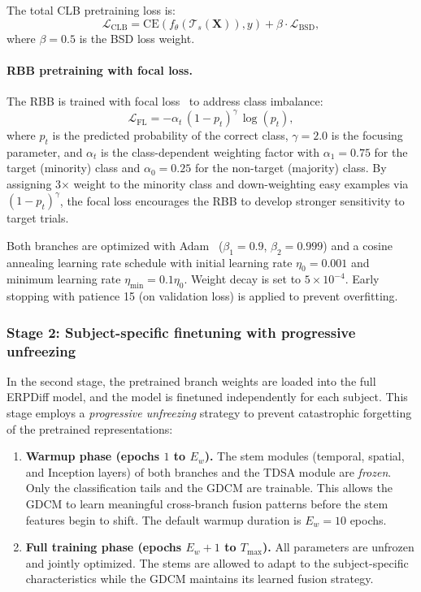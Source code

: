 The total CLB pretraining loss is:
\begin{equation}
    \mathcal{L}_{\text{CLB}} = \text{CE}(f_\theta(\mathcal{T}_s(\mathbf{X})), y) + \beta \cdot \mathcal{L}_{\text{BSD}},
\end{equation}
where $\beta = 0.5$ is the BSD loss weight.

\paragraph{RBB pretraining with focal loss.}
The RBB is trained with focal loss~\cite{lin2017focal} to address class imbalance:
\begin{equation}\label{eq:focal}
    \mathcal{L}_{\text{FL}} = -\alpha_t \, (1 - p_t)^\gamma \, \log(p_t),
\end{equation}
where $p_t$ is the predicted probability of the correct class, $\gamma = 2.0$ is the focusing parameter, and $\alpha_t$ is the class-dependent weighting factor with $\alpha_1 = 0.75$ for the target (minority) class and $\alpha_0 = 0.25$ for the non-target (majority) class. By assigning 3$\times$ weight to the minority class and down-weighting easy examples via $(1 - p_t)^\gamma$, the focal loss encourages the RBB to develop stronger sensitivity to target trials.

Both branches are optimized with Adam~\cite{kingma2015adam} ($\beta_1 = 0.9$, $\beta_2 = 0.999$) and a cosine annealing learning rate schedule with initial learning rate $\eta_0 = 0.001$ and minimum learning rate $\eta_{\min} = 0.1 \eta_0$. Weight decay is set to $5 \times 10^{-4}$. Early stopping with patience 15 (on validation loss) is applied to prevent overfitting.


\subsubsection{Stage 2: Subject-specific finetuning with progressive unfreezing}\label{sec:finetune}

In the second stage, the pretrained branch weights are loaded into the full ERPDiff model, and the model is finetuned independently for each subject. This stage employs a \emph{progressive unfreezing} strategy to prevent catastrophic forgetting of the pretrained representations:

\begin{enumerate}
    \item \textbf{Warmup phase (epochs $1$ to $E_w$).} The stem modules (temporal, spatial, and Inception layers) of both branches and the TDSA module are \emph{frozen}. Only the classification tails and the GDCM are trainable. This allows the GDCM to learn meaningful cross-branch fusion patterns before the stem features begin to shift. The default warmup duration is $E_w = 10$ epochs.
    \item \textbf{Full training phase (epochs $E_w + 1$ to $T_{\max}$).} All parameters are unfrozen and jointly optimized. The stems are allowed to adapt to the subject-specific characteristics while the GDCM maintains its learned fusion strategy.
\end{enumerate}

